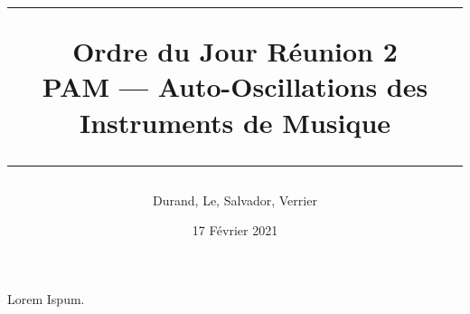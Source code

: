 \documentclass[a4paper, 11pt]{article}
\title{
	\noindent\rule{\linewidth}{0.4pt}
	\huge{Ordre du Jour Réunion 2\\}
	\medskip
	\Large{PAM --- Auto-Oscillations des Instruments de Musique}
	\noindent\rule{\linewidth}{1pt}
}
\author{Durand, Le, Salvador, Verrier}
\date{17 Février 2021}
\begin{document}
\maketitle


Lorem Ispum.
\end{document}
